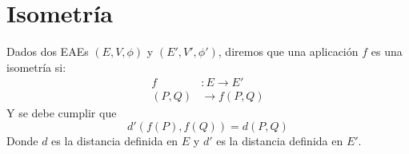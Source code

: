 \documentclass{./Geometria.tex}
\begin{document}
\section{Isometría}
\begin{defin}
Dados dos EAEs $(E, V, \phi)$ y $(E', V', \phi')$, diremos que una aplicación $f$ es una isometría si:
\begin{equation}
	\begin{split}
		f&: E \to E'\\
		(P,Q) &\to f(P,Q)
	\end{split}
\end{equation}
Y se debe cumplir que
\[
	\boxed{
		d'(f(P),f(Q)) = d(P,Q)
	}
\]
Donde $d$ es la distancia definida en $E$ y $d'$ es la distancia definida en $E'$.    
\end{defin}
\begin{center}
	

\end{center}
\end{document}
